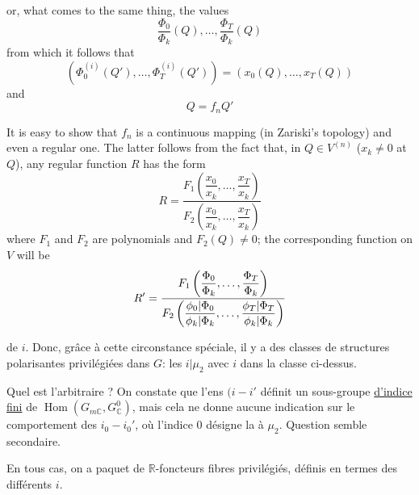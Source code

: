 or, what comes to the same thing, the values
\[
\frac{\Phi_0}{\Phi_k}(Q),\ldots,\frac{\Phi_T}{\Phi_k}(Q)
\]
from which it follows that
\[
(\Phi_0^{(i)}(Q'),\ldots,\Phi_T^{(i)}(Q'))=(x_0(Q),\ldots,x_T(Q))
\]
 and
\[
Q=f_nQ'
\]

It is easy to show that $f_n$ is a continuous mapping (in Zariski's topology) and even a regular one. The latter follows from the fact that, in $Q\in V^{(n)}$ ($x_k\ne0$ at $Q$), any regular function $R$ has the form
\[
R=\frac{F_1\left(\dfrac{x_0}{x_k},\ldots,\dfrac{x_T}{x_k}\right)}{F_2\left(\dfrac{x_0}{x_k},\ldots,\dfrac{x_T}{x_k}\right)}
\]
where $F_1$ and $F_2$ are polynomials and $F_2(Q)\ne0$; the corresponding function on $V$ will be
\[
R'=\frac{F_1\left(\dfrac{\Phi_0}{\Phi_k},\ldots,\dfrac{\Phi_T}{\Phi_k}\right)}{F_2\left(\dfrac{{\phi_0|\Phi_0}}{{\phi_k|\Phi_k}},\ldots,\dfrac{{\phi_T|\Phi_T}}{{\phi_k|\Phi_k}}\right)}
\]

de $i$. 
Donc, grâce à cette circonstance spéciale, il y a des classes de  structures polarisantes privilégiées dans $G$: les $i|\mu_2$ avec $i$ dans la classe ci-dessus.

Quel est l'arbitraire ? On constate que l'ens  $(i-i'$  définit un sous-groupe \uline{d'indice fini} de $\operatorname{Hom}(G_{m\mathbb C},G^0_{\mathbb C})$, mais cela ne donne aucune indication sur le comportement des $i_0-i_0'$, où l'indice $0$ désigne la  à $\mu_2$. Question semble secondaire.

En tous cas, on a   paquet de $\mathbb R$-foncteurs fibres privilégiés, définis en termes des différents $i$.


